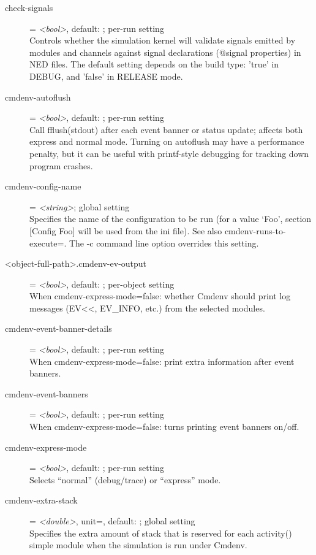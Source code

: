 \begin{description}
\item[check-signals] = \textit{<bool>}, default: ; per-run setting \\
    Controls whether the simulation kernel will validate signals emitted by
    modules and channels against signal declarations (@signal properties) in
    NED files. The default setting depends on the build type: 'true' in DEBUG,
    and 'false' in RELEASE mode.
\item[cmdenv-autoflush] = \textit{<bool>}, default: ; per-run setting \\
    Call fflush(stdout) after each event banner or status update; affects both
    express and normal mode. Turning on autoflush may have a performance
    penalty, but it can be useful with printf-style debugging for tracking down
    program crashes.
\item[cmdenv-config-name] = \textit{<string>}; global setting \\
    Specifies the name of the configuration to be run (for a value `Foo',
    section [Config Foo] will be used from the ini file). See also
    cmdenv-runs-to-execute=. The -c command line option overrides this setting.
\item[<object-full-path>.cmdenv-ev-output] = \textit{<bool>}, default: ; per-object setting \\
    When cmdenv-express-mode=false: whether Cmdenv should print log messages
    (EV<<, EV\_INFO, etc.) from the selected modules.
\item[cmdenv-event-banner-details] = \textit{<bool>}, default: ; per-run setting \\
    When cmdenv-express-mode=false: print extra information after event
    banners.
\item[cmdenv-event-banners] = \textit{<bool>}, default: ; per-run setting \\
    When cmdenv-express-mode=false: turns printing event banners on/off.
\item[cmdenv-express-mode] = \textit{<bool>}, default: ; per-run setting \\
    Selects ``normal'' (debug/trace) or ``express'' mode.
\item[cmdenv-extra-stack] = \textit{<double>}, unit=, default: ; global setting \\
    Specifies the extra amount of stack that is reserved for each activity()
    simple module when the simulation is run under Cmdenv.

\end{description}
